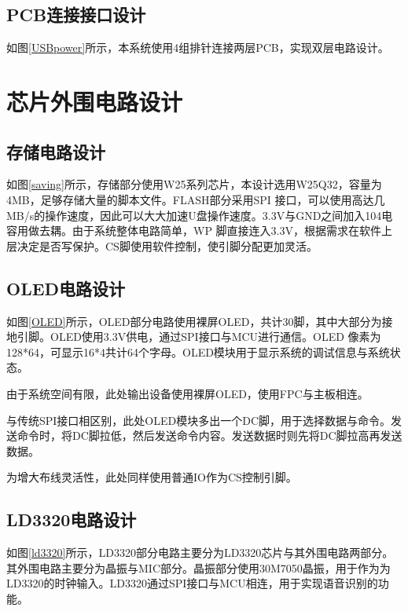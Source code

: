 \subsection{PCB连接接口设计}
如图\ref{USBpower}所示，本系统使用4组排针连接两层PCB，实现双层电路设计。

\section{芯片外围电路设计}
\subsection{存储电路设计}
如图\ref{saving}所示，存储部分使用W25系列芯片，本设计选用W25Q32，容量为4MB，足够存储大量的脚本文件。FLASH部分采用SPI 接口，可以使用高达几MB/s的操作速度，因此可以大大加速U盘操作速度。3.3V与GND之间加入104电容用做去耦。由于系统整体电路简单，WP 脚直接连入3.3V，根据需求在软件上层决定是否写保护。CS脚使用软件控制，使引脚分配更加灵活。

\subsection{OLED电路设计}
如图\ref{OLED}所示，OLED部分电路使用裸屏OLED，共计30脚，其中大部分为接地引脚。OLED使用3.3V供电，通过SPI接口与MCU进行通信。OLED 像素为128*64，可显示16*4共计64个字母。OLED模块用于显示系统的调试信息与系统状态。

由于系统空间有限，此处输出设备使用裸屏OLED，使用FPC与主板相连。

与传统SPI接口相区别，此处OLED模块多出一个DC脚，用于选择数据与命令。发送命令时，将DC脚拉低，然后发送命令内容。发送数据时则先将DC脚拉高再发送数据。

为增大布线灵活性，此处同样使用普通IO作为CS控制引脚。


\subsection{LD3320电路设计}
如图\ref{ld3320}所示，LD3320部分电路主要分为LD3320芯片与其外围电路两部分。其外围电路主要分为晶振与\gls{MIC}部分。晶振部分使用30M7050晶振，用于作为为LD3320的时钟输入。LD3320通过SPI接口与MCU相连，用于实现语音识别的功能。


